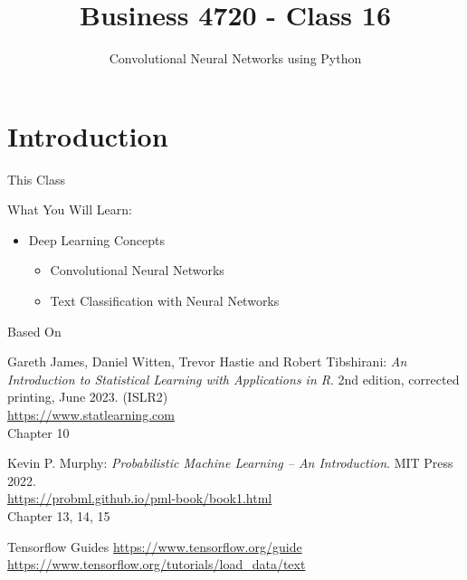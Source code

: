 \documentclass[ignorenonframetext,xcolor=x11names]{beamer}
\title{Business 4720 - Class 16}
\subtitle{Convolutional Neural Networks using Python}
\begin{document}
\begin{frame}{}
  \titlepage
  \footnotesize
  
\end{frame}

\section{Introduction}

\begin{frame}{This Class}

\begin{block}{What You Will Learn:}
\begin{itemize}
  \item Deep Learning Concepts
  \begin{itemize}
     \item Convolutional Neural Networks
     \item Text Classification with Neural Networks
  \end{itemize}
\end{itemize}
\end{block}
\end{frame}

\begin{frame}{Based On}
\small
\begin{block}{}
Gareth James, Daniel Witten, Trevor Hastie and Robert Tibshirani: \emph{An Introduction to Statistical Learning with Applications in R}. 2nd edition, corrected printing, June 2023. (ISLR2) \\
\vspace{1mm}
\url{https://www.statlearning.com} \\
\vspace{1mm}
Chapter 10
\end{block}

\begin{block}{}
Kevin P. Murphy: \emph{Probabilistic Machine Learning -- An Introduction}. MIT Press 2022. \\
\vspace{1mm}
\url{https://probml.github.io/pml-book/book1.html} \\
\vspace{1mm}
Chapter 13, 14, 15
\end{block}

\begin{block}{Tensorflow Guides}
\url{https://www.tensorflow.org/guide} \\
\url{https://www.tensorflow.org/tutorials/load_data/text}
\end{block}
\end{frame}
\end{document}
